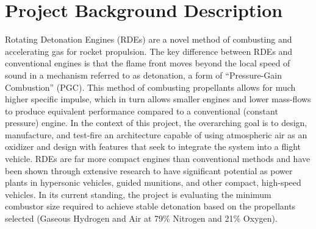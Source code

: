 \section*{Project Background Description}

Rotating Detonation Engines (RDEs) are a novel method of combusting and accelerating gas for rocket propulsion. The key difference between RDEs and conventional engines is that the flame front moves beyond the local speed of sound in a mechanism referred to as detonation, a form of “Pressure-Gain Combustion” (PGC). This method of combusting propellants allows for much higher specific impulse, which in turn allows smaller engines and lower mass-flows to produce equivalent performance compared to a conventional (constant pressure) engine. In the context of this project, the overarching goal is to design, manufacture, and test-fire an architecture capable of using atmospheric air as an oxidizer and design with features that seek to integrate the system into a flight vehicle. RDEs are far more compact engines than conventional methods and have been shown through extensive research to have significant potential as power plants in hypersonic vehicles, guided munitions, and other compact, high-speed vehicles. In its current standing, the project is evaluating the minimum combustor size required to achieve stable detonation based on the propellants selected (Gaseous Hydrogen and Air at 79\% Nitrogen and 21\% Oxygen).